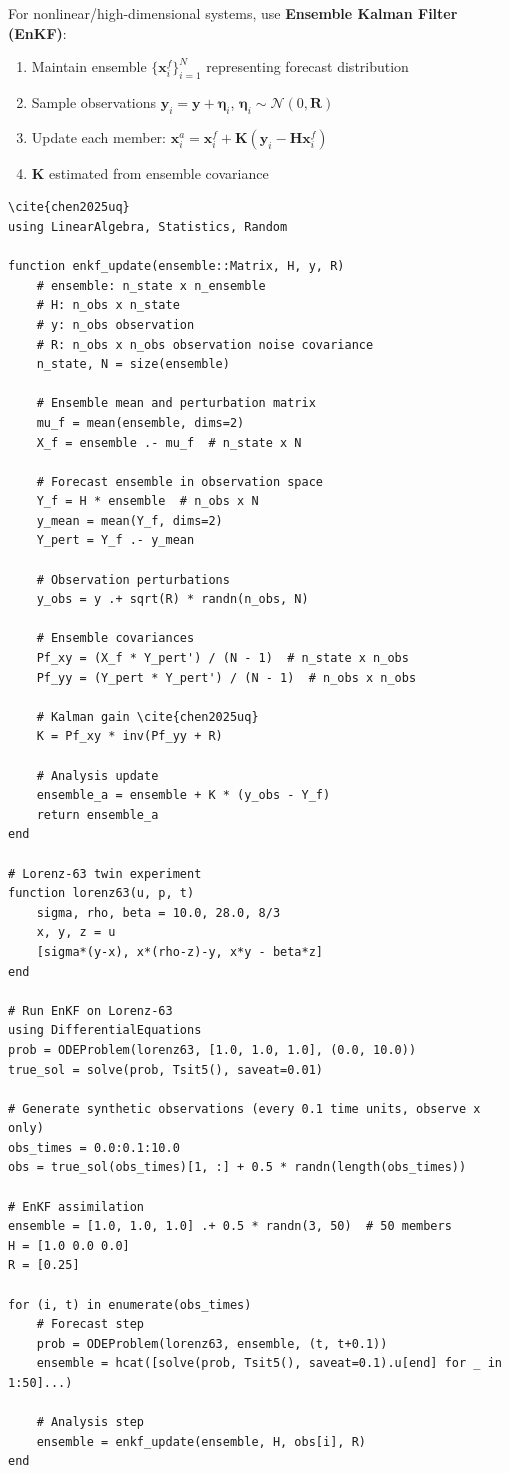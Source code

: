 For nonlinear/high-dimensional systems, use \textbf{Ensemble Kalman Filter (EnKF)}: \cite{chen2025uq}
\begin{enumerate}
    \item Maintain ensemble $\{\bm{x}_i^f\}_{i=1}^N$ representing forecast distribution
    \item Sample observations $\bm{y}_i = \bm{y} + \bm{\eta}_i$, $\bm{\eta}_i \sim \mathcal{N}(0, \bm{R})$
    \item Update each member: $\bm{x}_i^a = \bm{x}_i^f + \bm{K}(\bm{y}_i - \bm{H}\bm{x}_i^f)$
    \item $\bm{K}$ estimated from ensemble covariance
\end{enumerate}

\begin{lstlisting}[style=julia,caption=Ensemble Kalman Filter] \cite{chen2025uq}
using LinearAlgebra, Statistics, Random

function enkf_update(ensemble::Matrix, H, y, R)
    # ensemble: n_state x n_ensemble
    # H: n_obs x n_state
    # y: n_obs observation
    # R: n_obs x n_obs observation noise covariance
    n_state, N = size(ensemble)
    
    # Ensemble mean and perturbation matrix
    mu_f = mean(ensemble, dims=2)
    X_f = ensemble .- mu_f  # n_state x N
    
    # Forecast ensemble in observation space
    Y_f = H * ensemble  # n_obs x N
    y_mean = mean(Y_f, dims=2)
    Y_pert = Y_f .- y_mean
    
    # Observation perturbations
    y_obs = y .+ sqrt(R) * randn(n_obs, N)
    
    # Ensemble covariances
    Pf_xy = (X_f * Y_pert') / (N - 1)  # n_state x n_obs
    Pf_yy = (Y_pert * Y_pert') / (N - 1)  # n_obs x n_obs
    
    # Kalman gain \cite{chen2025uq}
    K = Pf_xy * inv(Pf_yy + R)
    
    # Analysis update
    ensemble_a = ensemble + K * (y_obs - Y_f)
    return ensemble_a
end

# Lorenz-63 twin experiment
function lorenz63(u, p, t)
    sigma, rho, beta = 10.0, 28.0, 8/3
    x, y, z = u
    [sigma*(y-x), x*(rho-z)-y, x*y - beta*z]
end

# Run EnKF on Lorenz-63
using DifferentialEquations
prob = ODEProblem(lorenz63, [1.0, 1.0, 1.0], (0.0, 10.0))
true_sol = solve(prob, Tsit5(), saveat=0.01)

# Generate synthetic observations (every 0.1 time units, observe x only)
obs_times = 0.0:0.1:10.0
obs = true_sol(obs_times)[1, :] + 0.5 * randn(length(obs_times))

# EnKF assimilation
ensemble = [1.0, 1.0, 1.0] .+ 0.5 * randn(3, 50)  # 50 members
H = [1.0 0.0 0.0]
R = [0.25]

for (i, t) in enumerate(obs_times)
    # Forecast step
    prob = ODEProblem(lorenz63, ensemble, (t, t+0.1))
    ensemble = hcat([solve(prob, Tsit5(), saveat=0.1).u[end] for _ in 1:50]...)
    
    # Analysis step
    ensemble = enkf_update(ensemble, H, obs[i], R)
end
\end{lstlisting}

